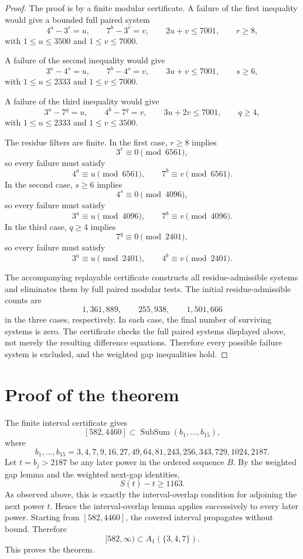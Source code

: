 \documentclass[11pt]{article}
\DeclareMathOperator{\SubSum}{SubSum}
\begin{document}
\begin{proof}
The proof is by a finite modular certificate. A failure of the first inequality
would give a bounded full paired system
\[
4^a-3^r=u,\qquad 7^b-3^r=v,\qquad 2u+v\le7001,\qquad r\ge8,
\]
with \(1\le u\le3500\) and \(1\le v\le7000\).

A failure of the second inequality would give
\[
3^a-4^s=u,\qquad 7^b-4^s=v,\qquad 3u+v\le7001,\qquad s\ge6,
\]
with \(1\le u\le2333\) and \(1\le v\le7000\).

A failure of the third inequality would give
\[
3^a-7^q=u,\qquad 4^b-7^q=v,\qquad 3u+2v\le7001,\qquad q\ge4,
\]
with \(1\le u\le2333\) and \(1\le v\le3500\).

The residue filters are finite. In the first case, \(r\ge8\) implies
\[
3^r\equiv0\pmod{6561},
\]
so every failure must satisfy
\[
4^a\equiv u\pmod{6561},\qquad 7^b\equiv v\pmod{6561}.
\]
In the second case, \(s\ge6\) implies
\[
4^s\equiv0\pmod{4096},
\]
so every failure must satisfy
\[
3^a\equiv u\pmod{4096},\qquad 7^b\equiv v\pmod{4096}.
\]
In the third case, \(q\ge4\) implies
\[
7^q\equiv0\pmod{2401},
\]
so every failure must satisfy
\[
3^a\equiv u\pmod{2401},\qquad 4^b\equiv v\pmod{2401}.
\]

The accompanying replayable certificate constructs all residue-admissible systems
and eliminates them by full paired modular tests. The initial residue-admissible
counts are
\[
1,361,889,\qquad 255,938,\qquad 1,501,666
\]
in the three cases, respectively. In each case, the final number of surviving
systems is zero. The certificate checks the full paired systems displayed above,
not merely the resulting difference equations. Therefore every possible failure
system is excluded, and the weighted gap inequalities hold.
\end{proof}

\section{Proof of the theorem}

The finite interval certificate gives
\[
[582,4460]\subset \SubSum(b_1,\ldots,b_{15}),
\]
where
\[
b_1,\ldots,b_{15}
=
3,4,7,9,16,27,49,64,81,243,256,343,729,1024,2187.
\]
Let \(t=b_j>2187\) be any later power in the ordered sequence \(B\). By the
weighted gap lemma and the weighted next-gap identities,
\[
S(t)-t\ge1163.
\]
As observed above, this is exactly the interval-overlap condition for adjoining
the next power \(t\). Hence the interval-overlap lemma applies successively to
every later power. Starting from \([582,4460]\), the covered interval propagates
without bound. Therefore
\[
[582,\infty)\subset A_1(\{3,4,7\}).
\]
This proves the theorem.
\end{document}
